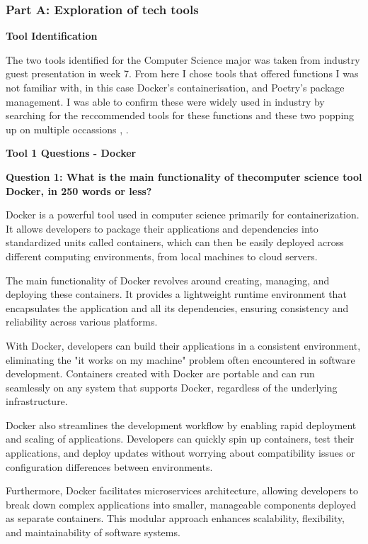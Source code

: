 \documentclass[a4paper, 11pt]{report}
\begin{document}
\subsubsection{Part A: Exploration of tech tools}

\textbf{\large{Tool Identification}}

The two tools identified for the Computer Science major was taken from industry guest presentation in week 7. From here I chose tools that offered functions I was not familiar with, in this case Docker’s containerisation, and Poetry’s package management.  I was able to confirm these were widely used in industry by searching for the reccommended tools for these functions and these two popping up on multiple occassions \cite{topcontainers}, \cite{pythonpackagemanagers}. 

\vspace{\baselineskip}
\textbf{\large{Tool 1 Questions - Docker}}

\textbf{Question 1: What is the main functionality of thecomputer science tool Docker, in 250 words or less?}  

Docker is a powerful tool used in computer science primarily for containerization. It allows developers to package their applications and dependencies into standardized units called containers, which can then be easily deployed across different computing environments, from local machines to cloud servers. 

The main functionality of Docker revolves around creating, managing, and deploying these containers. It provides a lightweight runtime environment that encapsulates the application and all its dependencies, ensuring consistency and reliability across various platforms. 

With Docker, developers can build their applications in a consistent environment, eliminating the "it works on my machine" problem often encountered in software development. Containers created with Docker are portable and can run seamlessly on any system that supports Docker, regardless of the underlying infrastructure. 

Docker also streamlines the development workflow by enabling rapid deployment and scaling of applications. Developers can quickly spin up containers, test their applications, and deploy updates without worrying about compatibility issues or configuration differences between environments. 

Furthermore, Docker facilitates microservices architecture, allowing developers to break down complex applications into smaller, manageable components deployed as separate containers. This modular approach enhances scalability, flexibility, and maintainability of software systems. 
\end{document}
